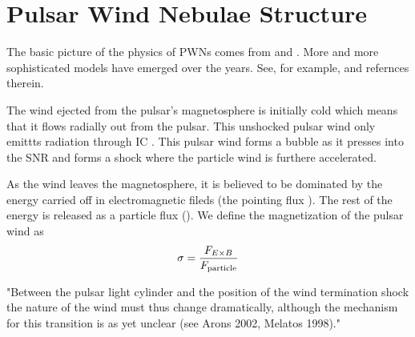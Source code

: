 \section{Pulsar Wind Nebulae Structure}

The basic picture of the physics of \acp{PWN}
comes from \cite{rees_1974_origin-magnetic} and
\cite{kennel_1984_magnetohydrodynamic-model}.  More and more
sophisticated models have emerged over the years.  See, for example,
\cite{gelfand_2009_dynamical-model} and refernces therein.

The wind ejected from the pulsar's magnetosphere is initially cold
which means that it flows radially out from the pulsar.
This unshocked pulsar wind only emittts radiation through \ac{IC}
\cite{bogovalov_2000_very-high-energy-gamma}.
This pulsar wind forms a bubble as it presses into
the \ac{SNR} and forms a shock where the particle wind is furthere accelerated.


As the wind
leaves the magnetosphere, it is believed to be dominated by the energy
carried off in electromagnetic fileds (the pointing flux \pointingflux).
The rest of the energy is released as a particle flux (\particleflux).  We define
the magnetization of the pulsar wind as
\begin{equation}
  \sigma = \frac{F_{E\times B}}{F_\text{particle}}
\end{equation}

"Between the pulsar light cylinder and the position of the wind
termination shock the nature of the wind must thus change dramatically,
although the mechanism for this transition is as yet unclear (see Arons
2002, Melatos 1998)."




